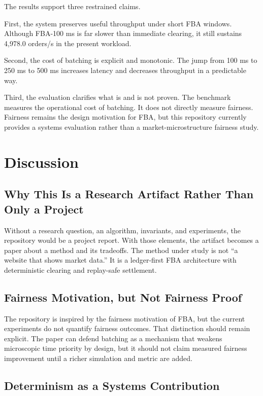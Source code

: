 \documentclass[11pt]{article}
\begin{document}
The results support three restrained claims.

First, the system preserves useful throughput under short FBA windows. Although FBA-100 ms is far slower than immediate clearing, it still sustains 4{,}978.0 orders/s in the present workload.

Second, the cost of batching is explicit and monotonic. The jump from 100 ms to 250 ms to 500 ms increases latency and decreases throughput in a predictable way.

Third, the evaluation clarifies what is and is not proven. The benchmark measures the operational cost of batching. It does not directly measure fairness. Fairness remains the design motivation for FBA, but this repository currently provides a systems evaluation rather than a market-microstructure fairness study.

\section{Discussion}

\subsection{Why This Is a Research Artifact Rather Than Only a Project}

Without a research question, an algorithm, invariants, and experiments, the repository would be a project report. With those elements, the artifact becomes a paper about a method and its tradeoffs. The method under study is not ``a website that shows market data.'' It is a ledger-first FBA architecture with deterministic clearing and replay-safe settlement.

\subsection{Fairness Motivation, but Not Fairness Proof}

The repository is inspired by the fairness motivation of FBA, but the current experiments do not quantify fairness outcomes. That distinction should remain explicit. The paper can defend batching as a mechanism that weakens microscopic time priority by design, but it should not claim measured fairness improvement until a richer simulation and metric are added.

\subsection{Determinism as a Systems Contribution}
\end{document}
